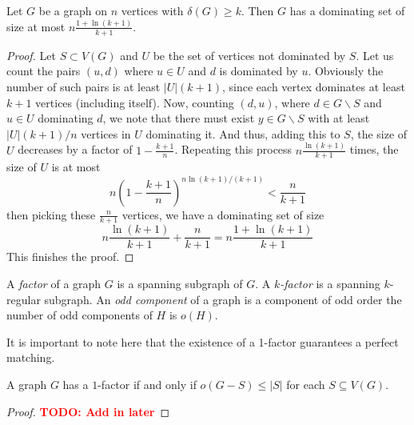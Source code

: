 \begin{theorem}
    Let $G$ be a graph on $n$ vertices with $\delta(G)\ge k$. Then $G$ has a dominating set of size at most $n\frac{1 + \ln(k + 1)}{k + 1}$.
\end{theorem}
\begin{proof}
    Let $S\subset V(G)$ and $U$ be the set of vertices not dominated by $S$. Let us count the pairs $(u, d)$ where $u\in U$ and $d$ is dominated by $u$. Obviously the number of such pairs is at least $|U|(k + 1)$, since each vertex dominates at least $k + 1$ vertices (including itself). Now, counting $(d, u)$, where $d\in G\backslash S$ and $u\in U$ dominating $d$, we note that there must exist $y\in G\backslash S$ with at least $|U|(k + 1)/n$ vertices in $U$ dominating it. And thus, adding this to $S$, the size of $U$ decreases by a factor of $1 - \frac{k + 1}{n}$. Repeating this process $n\frac{\ln(k + 1)}{k + 1}$ times, the size of $U$ is at most 
    \begin{equation*}
        n\left(1 - \frac{k + 1}{n}\right)^{n\ln(k + 1)/(k + 1)} < \frac{n}{k + 1}
    \end{equation*}
    then picking these $\frac{n}{k + 1}$ vertices, we have a dominating set of size 
    \begin{equation*}
        n\frac{\ln(k + 1)}{k + 1} + \frac{n}{k + 1} = n\frac{1 + \ln(k + 1)}{k + 1}
    \end{equation*}
    This finishes the proof.
\end{proof}

\begin{definition}[Factor]
    A \textit{factor} of a graph $G$ is a spanning subgraph of $G$. A \textit{$k$-factor} is a spanning $k$-regular subgraph. An \textit{odd component} of a graph is a component of odd order the number of odd components of $H$ is $o(H)$.
\end{definition}

It is important to note here that the existence of a 1-factor guarantees a perfect matching.

\begin{theorem}[Tutte, 1947]
    A graph $G$ has a $1$-factor if and only if $o(G-S)\le|S|$ for each $S\subseteq V(G)$.
\end{theorem}
\begin{proof}
    \textbf{\textcolor{red}{TODO: Add in later}}
\end{proof}